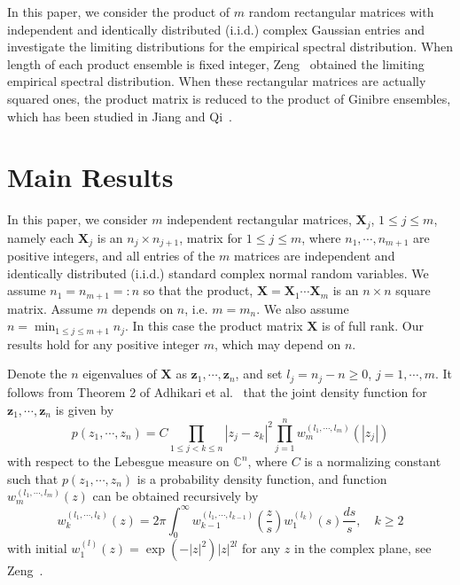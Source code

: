 \documentclass[12pt]{article}
\theoremstyle{plain}
\theoremstyle{definition}
\theoremstyle{remark}
\begin{document}
In this paper, we consider the product of $m$ random rectangular
matrices with independent and identically distributed (i.i.d.)
complex Gaussian entries and investigate the limiting distributions
for the empirical spectral distribution. When length of each product ensemble is fixed integer,
Zeng~\cite{zeng2016} obtained the limiting empirical spectral
distribution. When these rectangular matrices are actually squared
ones, the product matrix is reduced to the product of Ginibre
ensembles, which has been studied in Jiang and
Qi~\cite{JiangQi2019}.


\section{Main Results}\label{sec:main}
In this paper, we consider $m$ independent rectangular matrices, $\mathbf{X}_j$, $1\leq j \leq m$, namely each $\mathbf{X}_j$ is an $n_j\times n_{j+1}$, matrix for $1\leq j\leq m$, where $n_1,\cdots, n_{m+1}$ are positive integers, and all entries of the $m$ matrices are independent and identically distributed (i.i.d.) standard complex normal random variables. We assume $n_1=n_{m+1}=:n$ so that the product, $\mathbf{X}=\mathbf{X}_1 \cdots \mathbf{X}_{m}$ is an $n\times n$ square matrix. Assume $m$ depends on $n$, i.e. $m=m_n$. We also assume $n=\min_{1\leq j\leq m+1}n_j$. In this case the product matrix $\mathbf{X}$ is of full rank. Our results hold for any positive integer $m$, which may depend on $n$.

Denote the $n$ eigenvalues of $\mathbf{X}$ as $\mathbf{z}_{1},
\cdots, \mathbf{z}_{n}$, and set $l_{j}=n_{j}-n\geq 0$, $j=1,
\cdots, m$. It follows from Theorem 2 of Adhikari et
al.~\cite{Adhikari} that the joint density function for
$\mathbf{z}_{1}, \cdots, \mathbf{z}_{n}$ is given by
\begin{equation*}
p\left({z}_{1}, \cdots, {z}_{n}\right)=C \prod_{1 \leq j<k \leq
n}\left|{z}_{j}-{z}_{k}\right|^{2} \prod_{j=1}^{n}
w_{m}^{\left(l_{1}, \cdots,
l_{m}\right)}\left(\left|z_{j}\right|\right)
\end{equation*}
with
respect to the Lebesgue measure on $\mathbb{C}^{n}$, where $C$ is a
normalizing constant such that $p(z_1,\cdots, z_n)$ is a probability
density function, and function $w_{m}^{\left(l_{1}, \cdots,
l_{m}\right)}(z)$ can be obtained recursively by
\begin{equation*}
w_{k}^{\left(l_{1}, \cdots, l_{k}\right)}(z)=2 \pi \int_{0}^{\infty}
w_{k-1}^{\left(l_{1}, \cdots,
l_{k-1}\right)}\left(\frac{z}{s}\right)
w_{1}^{\left(l_{k}\right)}(s) \frac{d s}{s}, \quad k \geq 2
\end{equation*} with initial $w_{1}^{(l)}(z)=\exp
\left(-|z|^{2}\right)|z|^{2 l}$ for any $z$ in the complex plane,
see Zeng~\cite{zeng2016}.
\end{document}
